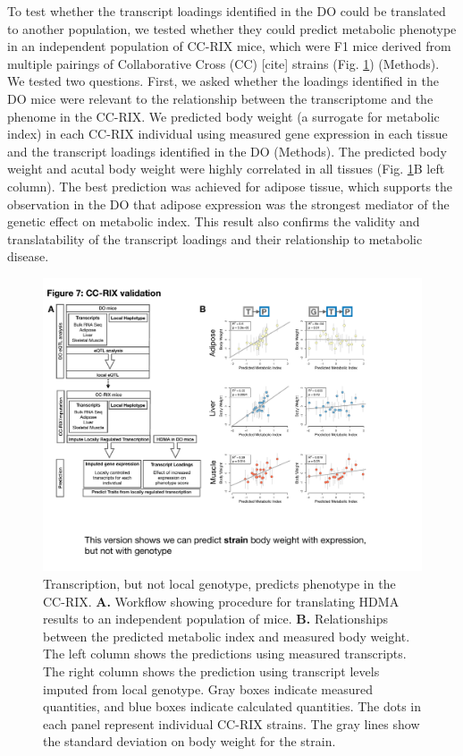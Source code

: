 \documentclass[
]{article}
\begin{document}
To test whether the transcript loadings identified in the DO could be
translated to another population, we tested whether they could predict
metabolic phenotype in an independent population of CC-RIX mice, which
were F1 mice derived from multiple pairings of Collaborative Cross (CC)
{[}cite{]} strains (Fig. \ref{fig:cc_prediction}) (Methods). We tested
two questions. First, we asked whether the loadings identified in the DO
mice were relevant to the relationship between the transcriptome and the
phenome in the CC-RIX. We predicted body weight (a surrogate for
metabolic index) in each CC-RIX individual using measured gene
expression in each tissue and the transcript loadings identified in the
DO (Methods). The predicted body weight and acutal body weight were
highly correlated in all tissues (Fig. \ref{fig:cc_prediction}B left
column). The best prediction was achieved for adipose tissue, which
supports the observation in the DO that adipose expression was the
strongest mediator of the genetic effect on metabolic index. This result
also confirms the validity and translatability of the transcript
loadings and their relationship to metabolic disease.

\begin{figure}[ht!]
\includegraphics[width=\textwidth]{Figures/Fig7_CC_Prediction.pdf} 
\caption{Transcription, but not local genotype, predicts 
phenotype in the CC-RIX. \textbf{A.} Workflow showing procedure 
for translating HDMA results to an independent population of mice. 
\textbf{B.} Relationships between the predicted metabolic index 
and measured body weight. The left column shows the predictions 
using measured transcripts. The right column shows the prediction 
using transcript levels imputed from local genotype. Gray boxes 
indicate measured quantities, and blue boxes indicate calculated 
quantities. The dots in each panel represent individual CC-RIX strains. 
The gray lines show the standard deviation on body weight for the strain.
}
\label{fig:cc_prediction}
\end{figure}
\end{document}
